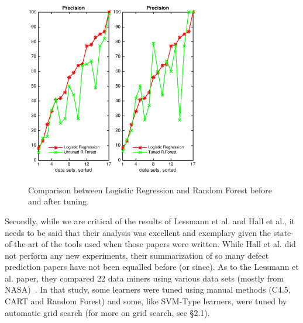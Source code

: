 \documentclass{sig-alternative}
\begin{document}
\begin{figure}[!t]
\begin{center}
\includegraphics[width=1.5in]{./eps/LR_untuned.eps}\includegraphics[width=1.5in]{./eps/LR_tuned.eps}
 \end{center}
\caption{Comparison between Logistic Regression and Random Forest before and after tuning. }\label{fig:lr}
 \end{figure}
 
Secondly, while we are critical of the results of
Lessmann et al. and Hall et al., it needs to be said that  their analysis  was 
excellent and exemplary given the state-of-the-art of the tools used when those papers were written.  
While Hall et al. did not perform any new experiments, 
their
summarization of so many defect prediction papers have not been equalled
before (or since).
As to the Lessmann et al. paper, they  compared
22 data miners using various   data sets (mostly from NASA)~\cite{lessmann2008benchmarking}.
In that study, some learners were tuned using manual methods 
(C4.5, CART and Random Forest)
and some, like SVM-Type learners, were tuned by automatic grid search (for more on grid search, see   {\S}2.1).
\end{document}
